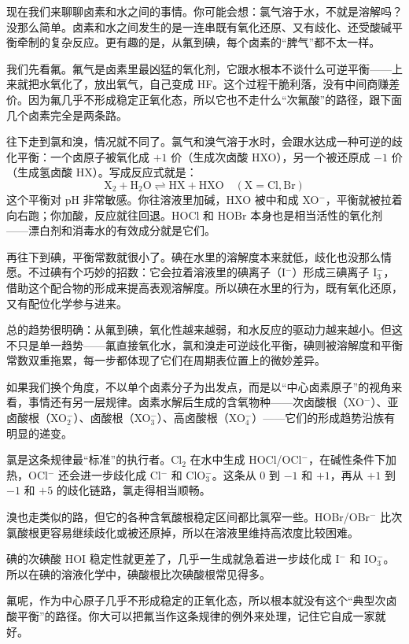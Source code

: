 \documentclass[UTF8]{ctexbook}
\begin{document}
现在我们来聊聊卤素和水之间的事情。你可能会想：氯气溶于水，不就是溶解吗？没那么简单。卤素和水之间发生的是一连串既有氧化还原、又有歧化、还受酸碱平衡牵制的复杂反应。更有趣的是，从氟到碘，每个卤素的“脾气”都不太一样。

我们先看氟。氟气是卤素里最凶猛的氧化剂，它跟水根本不谈什么可逆平衡——上来就把水氧化了，放出氧气，自己变成 HF。这个过程干脆利落，没有中间商赚差价。因为氟几乎不形成稳定正氧化态，所以它也不走什么“次氟酸”的路径，跟下面几个卤素完全是两条路。

往下走到氯和溴，情况就不同了。氯气和溴气溶于水时，会跟水达成一种可逆的歧化平衡：一个卤原子被氧化成 $+1$ 价（生成次卤酸 HXO），另一个被还原成 $-1$ 价（生成氢卤酸 HX）。写成反应式就是：
\[
\mathrm{X_2 + H_2O \rightleftharpoons HX + HXO}\quad (\mathrm{X=Cl,Br})
\]
这个平衡对 pH 非常敏感。你往溶液里加碱，HXO 被中和成 XO$^-$，平衡就被拉着向右跑；你加酸，反应就往回退。HOCl 和 HOBr 本身也是相当活性的氧化剂——漂白剂和消毒水的有效成分就是它们。

再往下到碘，平衡常数就很小了。碘在水里的溶解度本来就低，歧化也没那么情愿。不过碘有个巧妙的招数：它会拉着溶液里的碘离子（I$^-$）形成三碘离子 I$_3^-$，借助这个配合物的形成来提高表观溶解度。所以碘在水里的行为，既有氧化还原，又有配位化学参与进来。

总的趋势很明确：从氟到碘，氧化性越来越弱，和水反应的驱动力越来越小。但这不只是单一趋势——氟直接氧化水，氯和溴走可逆歧化平衡，碘则被溶解度和平衡常数双重拖累，每一步都体现了它们在周期表位置上的微妙差异。

\medskip

如果我们换个角度，不以单个卤素分子为出发点，而是以“中心卤素原子”的视角来看，事情还有另一层规律。卤素水解后生成的含氧物种——次卤酸根（XO$^-$）、亚卤酸根（XO$_2^-$）、卤酸根（XO$_3^-$）、高卤酸根（XO$_4^-$）——它们的形成趋势沿族有明显的递变。

氯是这条规律最“标准”的执行者。Cl$_2$ 在水中生成 HOCl/OCl$^-$，在碱性条件下加热，OCl$^-$ 还会进一步歧化成 Cl$^-$ 和 ClO$_3^-$。这条从 $0$ 到 $-1$ 和 $+1$，再从 $+1$ 到 $-1$ 和 $+5$ 的歧化链路，氯走得相当顺畅。

溴也走类似的路，但它的各种含氧酸根稳定区间都比氯窄一些。HOBr/OBr$^-$ 比次氯酸根更容易继续歧化或被还原掉，所以在溶液里维持高浓度比较困难。

碘的次碘酸 HOI 稳定性就更差了，几乎一生成就急着进一步歧化成 I$^-$ 和 IO$_3^-$。所以在碘的溶液化学中，碘酸根比次碘酸根常见得多。

氟呢，作为中心原子几乎不形成稳定的正氧化态，所以根本就没有这个“典型次卤酸平衡”的路径。你大可以把氟当作这条规律的例外来处理，记住它自成一家就好。
\end{document}
